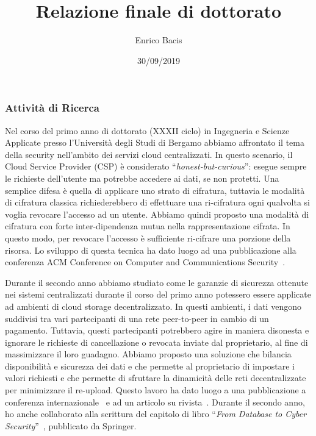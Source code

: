 \documentclass{article}
\begin{document}
\title{Relazione finale di dottorato}
\author{Enrico Bacis}
\date{30/09/2019}

\maketitle

\vspace{40px}

\subsubsection*{Attività di Ricerca}

Nel corso del primo anno di dottorato (XXXII ciclo) in Ingegneria e Scienze Applicate presso l'Università degli Studi di Bergamo abbiamo affrontato il tema della security nell'ambito dei servizi cloud centralizzati. In questo scenario, il Cloud Service Provider (CSP) è considerato ``{\em honest-but-curious}'': esegue sempre le richieste dell'utente ma potrebbe accedere ai dati, se non protetti. Una semplice difesa è quella di applicare uno strato di cifratura, tuttavia le modalità di cifratura classica richiederebbero di effettuare una ri-cifratura ogni qualvolta si voglia revocare l'accesso ad un utente. Abbiamo quindi proposto una modalità di cifratura con forte inter-dipendenza mutua nella rappresentazione cifrata. In questo modo, per revocare l'accesso è sufficiente ri-cifrare una porzione della risorsa. Lo sviluppo di questa tecnica ha dato luogo ad una pubblicazione alla conferenza ACM Conference on Computer and Communications Security~\cite{ccs}.

\medskip
Durante il secondo anno abbiamo studiato come le garanzie di sicurezza ottenute nei sistemi centralizzati durante il corso del primo anno potessero essere applicate ad ambienti di cloud storage decentralizzato. In questi ambienti, i dati vengono suddivisi tra vari partecipanti di una rete peer-to-peer in cambio di un pagamento. Tuttavia, questi partecipanti potrebbero agire in maniera disonesta e ignorare le richieste di cancellazione o revocata inviate dal proprietario, al fine di massimizzare il loro guadagno. Abbiamo proposto una soluzione che bilancia disponibilità e sicurezza dei dati e che permette al proprietario di impostare i valori richiesti e che permette di sfruttare la dinamicità delle reti decentralizzate per minimizzare il re-upload. Questo lavoro ha dato luogo a una pubblicazione a conferenza internazionale~\cite{tifs} e ad un articolo su rivista~\cite{globecomm}.
Durante il secondo anno, ho anche collaborato alla scrittura del capitolo di libro ``{\em From Database to Cyber Security}''~\cite{sushil}, pubblicato da Springer.
\end{document}
